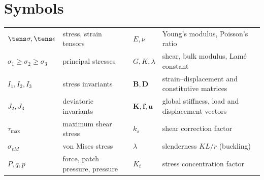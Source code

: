 \section{Symbols}
\begin{center}\small
\begin{tabular}{@{}p{2.2cm}p{5.0cm}p{2.2cm}p{5.0cm}@{}}\toprule
$\tens\sigma,\tens\epsilon$ & stress, strain tensors & $E,\nu$ & Young's modulus, Poisson's ratio\\
$\sigma_1\ge\sigma_2\ge\sigma_3$ & principal stresses & $G,K,\lambda$ & shear, bulk modulus, Lam\'e constant\\
$I_1,I_2,I_3$ & stress invariants & $\mathbf B,\mathbf D$ & strain--displacement and constitutive matrices\\
$J_2,J_3$ & deviatoric invariants & $\mathbf K,\mathbf f,\mathbf u$ & global stiffness, load and displacement vectors\\
$\tau_{\max}$ & maximum shear stress & $k_s$ & shear correction factor\\
$\sigma_{vM}$ & von Mises stress & $\lambda$ & slenderness $KL/r$ (buckling)\\
$P,q,p$ & force, patch pressure, pressure & $K_t$ & stress concentration factor\\\bottomrule
\end{tabular}
\end{center}
